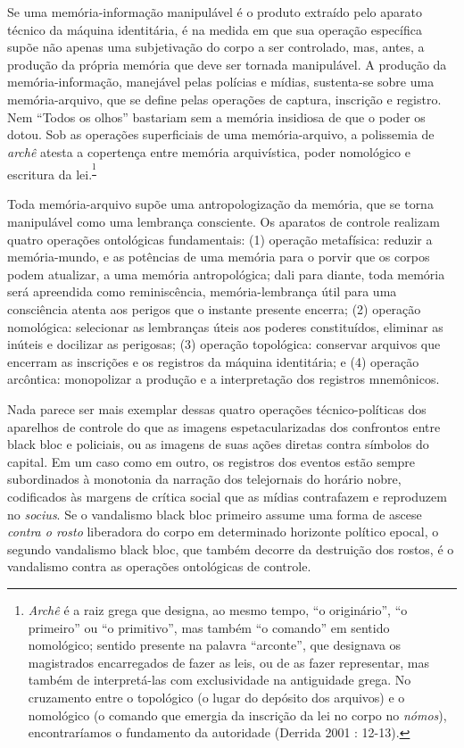 Se uma memória-informação manipulável é o produto extraído pelo aparato
técnico da máquina identitária, é na medida em que sua operação
específica supõe não apenas uma subjetivação do corpo a ser controlado,
mas, antes, a produção da própria memória que deve ser tornada
manipulável. A produção da memória-informação, manejável pelas polícias
e mídias, sustenta-se sobre uma memória-arquivo, que se define pelas
operações de captura, inscrição e registro. Nem ``Todos os olhos''
bastariam sem a memória insidiosa de que o poder os dotou. Sob as
operações superficiais de uma memória-arquivo, a polissemia de
\emph{archê} atesta a copertença entre memória arquivística, poder
nomológico e escritura da lei.\textsuperscript{\footnote{\emph{Archê }é
  a\emph{ }raiz grega que designa, ao mesmo tempo, ``o originário'', ``o
  primeiro'' ou ``o primitivo'', mas também ``o comando'' em sentido
  nomológico; sentido presente na palavra ``arconte'', que designava os
  magistrados encarregados de fazer as leis, ou de as fazer representar,
  mas também de interpretá-las com exclusividade na antiguidade grega.
  No cruzamento entre o topológico (o lugar do depósito dos arquivos) e
  o nomológico (o comando que emergia da inscrição da lei no corpo no
  \emph{nómos}), encontraríamos o fundamento da autoridade (Derrida 2001
  : 12-13).}}

Toda memória-arquivo supõe uma antropologização da memória, que se torna
manipulável como uma lembrança consciente. Os aparatos de controle
realizam quatro operações ontológicas fundamentais: (1) operação
metafísica: reduzir a memória-mundo, e as potências de uma memória para
o porvir que os corpos podem atualizar, a uma memória antropológica;
dali para diante, toda memória será apreendida como reminiscência,
memória-lembrança útil para uma consciência atenta aos perigos que o
instante presente encerra; (2) operação nomológica: selecionar as
lembranças úteis aos poderes constituídos, eliminar as inúteis e
docilizar as perigosas; (3) operação topológica: conservar arquivos que
encerram as inscrições e os registros da máquina identitária; e (4)
operação arcôntica: monopolizar a produção e a interpretação dos
registros mnemônicos.

Nada parece ser mais exemplar dessas quatro operações técnico-políticas
dos aparelhos de controle do que as imagens espetacularizadas dos
confrontos entre black bloc e policiais, ou as imagens de suas ações
diretas contra símbolos do capital. Em um caso como em outro, os
registros dos eventos estão sempre subordinados à monotonia da narração
dos telejornais do horário nobre, codificados às margens de crítica
social que as mídias contrafazem e reproduzem no \emph{socius}. Se o
vandalismo black bloc primeiro assume uma forma de ascese \emph{contra o
rosto} liberadora do corpo em determinado horizonte político epocal, o
segundo vandalismo black bloc, que também decorre da destruição dos
rostos, é o vandalismo contra as operações ontológicas de controle.

